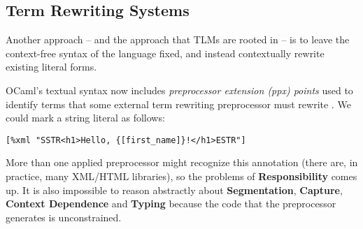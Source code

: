 \documentclass[acmsmall,review,anonymous]{acmart}\settopmatter{printfolios=true,printccs=false,printacmref=false}
\newcommand{\li}[1]{\lstinline[basicstyle=\ttfamily\fontsize{9pt}{1em}\selectfont]{#1}}
\begin{document}


\subsection{Term Rewriting Systems}
Another approach -- and the approach that TLMs are rooted in -- is to leave the context-free syntax of the language fixed, and instead contextually rewrite existing literal forms.

OCaml's textual syntax now includes \emph{preprocessor extension (ppx) points} used to identify terms that some external term rewriting preprocessor must rewrite \cite{ocaml-manual}. We could  mark a string literal as follows:
\begin{lstlisting}[numbers=none]
    [%xml "SSTR<h1>Hello, {[first_name]}!</h1>ESTR"]
\end{lstlisting}
More than one applied preprocessor might recognize this annotation (there are, in practice, many XML/HTML libraries), so the problems of \textbf{Responsibility} comes up. It is also impossible to reason abstractly about \textbf{Segmentation}, \textbf{Capture}, \textbf{Context Dependence} and \textbf{Typing} because the code that the preprocessor generates is unconstrained.%
\end{document}
